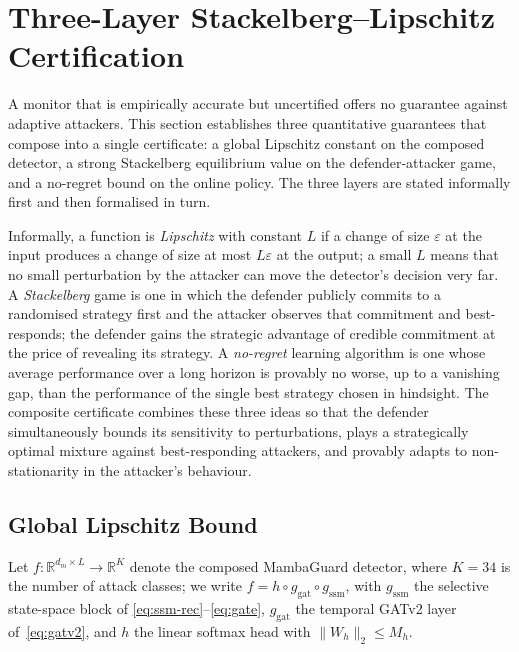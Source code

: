 \documentclass{ieeeaccess}
\newcommand{\R}{\mathbb{R}}
\begin{document}
\section{Three-Layer Stackelberg--Lipschitz Certification}
\label{sec:certification}
A monitor that is empirically accurate but uncertified offers no guarantee against adaptive attackers. This section establishes three quantitative guarantees that compose into a single certificate: a global Lipschitz constant on the composed detector, a strong Stackelberg equilibrium value on the defender-attacker game, and a no-regret bound on the online policy. The three layers are stated informally first and then formalised in turn.

Informally, a function is \emph{Lipschitz} with constant $L$ if a change of size $\varepsilon$ at the input produces a change of size at most $L\varepsilon$ at the output; a small $L$ means that no small perturbation by the attacker can move the detector's decision very far. A \emph{Stackelberg} game is one in which the defender publicly commits to a randomised strategy first and the attacker observes that commitment and best-responds; the defender gains the strategic advantage of credible commitment at the price of revealing its strategy. A \emph{no-regret} learning algorithm is one whose average performance over a long horizon is provably no worse, up to a vanishing gap, than the performance of the single best strategy chosen in hindsight. The composite certificate combines these three ideas so that the defender simultaneously bounds its sensitivity to perturbations, plays a strategically optimal mixture against best-responding attackers, and provably adapts to non-stationarity in the attacker's behaviour.

\subsection{Global Lipschitz Bound}
\label{sec:lipschitz}
Let $f:\R^{d_{m}\times L}\to\R^{K}$ denote the composed MambaGuard detector, where $K=34$ is the number of attack classes; we write $f=h\circ g_{\text{gat}}\circ g_{\text{ssm}}$, with $g_{\text{ssm}}$ the selective state-space block of \eqref{eq:ssm-rec}--\eqref{eq:gate}, $g_{\text{gat}}$ the temporal GATv2 layer of~\eqref{eq:gatv2}, and $h$ the linear softmax head with $\|W_{h}\|_{2}\le M_{h}$.
\end{document}
